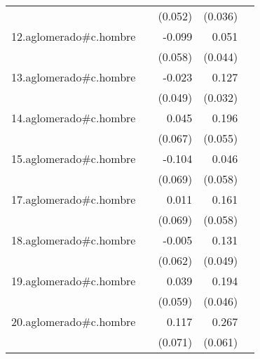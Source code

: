 {\begin{longtable}{l*{4}{D{.}{.}{-1}}}
            &                     &     (0.052)         &     (0.036)         &                     \\
\addlinespace
12.aglomerado#c.hombre&                     &      -0.099         &       0.051         &                     \\
            &                     &     (0.058)         &     (0.044)         &                     \\
\addlinespace
13.aglomerado#c.hombre&                     &      -0.023         &       0.127\sym{***}&                     \\
            &                     &     (0.049)         &     (0.032)         &                     \\
\addlinespace
14.aglomerado#c.hombre&                     &       0.045         &       0.196\sym{***}&                     \\
            &                     &     (0.067)         &     (0.055)         &                     \\
\addlinespace
15.aglomerado#c.hombre&                     &      -0.104         &       0.046         &                     \\
            &                     &     (0.069)         &     (0.058)         &                     \\
\addlinespace
17.aglomerado#c.hombre&                     &       0.011         &       0.161\sym{**} &                     \\
            &                     &     (0.069)         &     (0.058)         &                     \\
\addlinespace
18.aglomerado#c.hombre&                     &      -0.005         &       0.131\sym{**} &                     \\
            &                     &     (0.062)         &     (0.049)         &                     \\
\addlinespace
19.aglomerado#c.hombre&                     &       0.039         &       0.194\sym{***}&                     \\
            &                     &     (0.059)         &     (0.046)         &                     \\
\addlinespace
20.aglomerado#c.hombre&                     &       0.117         &       0.267\sym{***}&                     \\
            &                     &     (0.071)         &     (0.061)         &                     \\

\end{longtable}}
